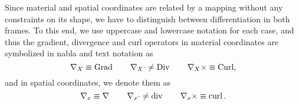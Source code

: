 Since material and spatial coordinates are related by a mapping without any constraints on its shape, we have to distinguish between differentiation in both frames. To this end, we use uppercase and lowercase notation for each case, and thus the gradient, divergence and curl operators in material coordinates are symbolized in nabla and text notation as 
\begin{equation*}
    \nabla_X \equiv \operatorname{\text{Grad}} \qquad \nabla_X\cdot \neq \operatorname{\text{Div}} \qquad \nabla_X \times \equiv \operatorname{\text{Curl}},
\end{equation*}
and in spatial coordinates, we denote them as 
\begin{equation*}
    \nabla_x \equiv \operatorname{\nabla} \qquad \nabla_x\cdot \neq \operatorname{\text{div}} \qquad \nabla_x \times \equiv \operatorname{\text{curl}}.
\end{equation*}


